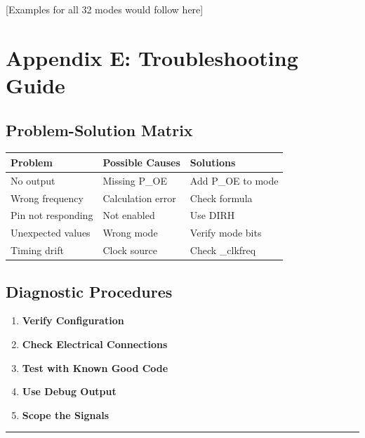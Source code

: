 \documentclass[11pt,a4paper,oneside,english]{book}
\begin{document}
{[}Examples for all 32 modes would follow here{]}

\clearpage

\clearpage

\hypertarget{appendix-e-troubleshooting-guide}{%
\chapter{Appendix E: Troubleshooting
Guide}\label{appendix-e-troubleshooting-guide}}

\hypertarget{problem-solution-matrix}{%
\section{Problem-Solution Matrix}\label{problem-solution-matrix}}

\begin{longtable}[]{@{}lll@{}}
\toprule
Problem & Possible Causes & Solutions \\
\midrule
\endhead
No output & Missing P\_OE & Add P\_OE to mode \\
Wrong frequency & Calculation error & Check formula \\
Pin not responding & Not enabled & Use DIRH \\
Unexpected values & Wrong mode & Verify mode bits \\
Timing drift & Clock source & Check \_clkfreq \\
\bottomrule
\end{longtable}

\hypertarget{diagnostic-procedures}{%
\section{Diagnostic Procedures}\label{diagnostic-procedures}}

\begin{enumerate}
\def\labelenumi{\arabic{enumi}.}
\tightlist
\item
  \textbf{Verify Configuration}
\item
  \textbf{Check Electrical Connections}
\item
  \textbf{Test with Known Good Code}
\item
  \textbf{Use Debug Output}
\item
  \textbf{Scope the Signals}
\end{enumerate}

\begin{center}\rule{0.5\linewidth}{0.5pt}\end{center}
\end{document}
